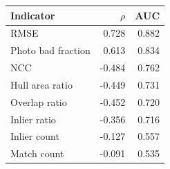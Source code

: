\begin{tabular}{lrr}
\toprule
Indicator & $\rho$ & AUC \\
\midrule
RMSE & 0.728 & 0.882 \\
Photo bad fraction & 0.613 & 0.834 \\
NCC & -0.484 & 0.762 \\
Hull area ratio & -0.449 & 0.731 \\
Overlap ratio & -0.452 & 0.720 \\
Inlier ratio & -0.356 & 0.716 \\
Inlier count & -0.127 & 0.557 \\
Match count & -0.091 & 0.535 \\
\bottomrule
\end{tabular}
